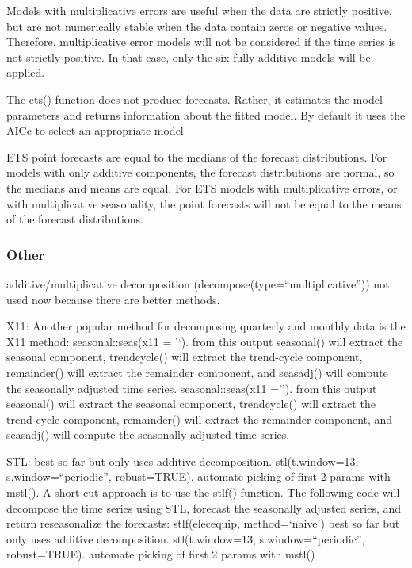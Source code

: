 \documentclass[]{book}
\begin{document}
Models with multiplicative errors are useful when the data are strictly positive, but are not numerically stable when the data contain zeros or negative values. Therefore, multiplicative error models will not be considered if the time series is not strictly positive. In that case, only the six fully additive models will be applied.

The ets() function does not produce forecasts. Rather, it estimates the model parameters and returns information about the fitted model. By default it uses the AICc to select an appropriate model

ETS point forecasts are equal to the medians of the forecast distributions. For models with only additive components, the forecast distributions are normal, so the medians and means are equal. For ETS models with multiplicative errors, or with multiplicative seasonality, the point forecasts will not be equal to the means of the forecast distributions.

\hypertarget{other-2}{%
\subsubsection{Other}\label{other-2}}

additive/multiplicative decomposition (decompose(type=``multiplicative'')) not used now because there are better methods.

X11: Another popular method for decomposing quarterly and monthly data is the X11 method: seasonal::seas(x11 = '`). from this output seasonal() will extract the seasonal component, trendcycle() will extract the trend-cycle component, remainder() will extract the remainder component, and seasadj() will compute the seasonally adjusted time series. seasonal::seas(x11 =''). from this output seasonal() will extract the seasonal component, trendcycle() will extract the trend-cycle component, remainder() will extract the remainder component, and seasadj() will compute the seasonally adjusted time series.

STL: best so far but only uses additive decomposition. stl(t.window=13, s.window=``periodic'', robust=TRUE). automate picking of first 2 params with mstl(). A short-cut approach is to use the stlf() function. The following code will decompose the time series using STL, forecast the seasonally adjusted series, and return reseasonalize the forecasts: stlf(elecequip, method=`naive') best so far but only uses additive decomposition. stl(t.window=13, s.window=``periodic'', robust=TRUE). automate picking of first 2 params with mstl()
\end{document}
